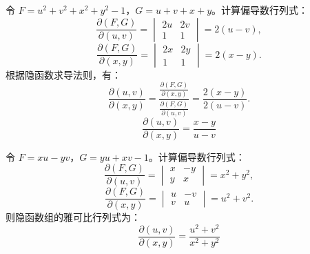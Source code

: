 \begin{solution}

    令 $F = u^2 + v^2 + x^2 + y^2 - 1$，$G = u + v + x + y$。计算偏导数行列式：
    \begin{equation}
        \frac{\partial(F,G)}{\partial(u,v)} =
        \begin{vmatrix}
            2u & 2v \\
            1  & 1
        \end{vmatrix} = 2(u - v),
    \end{equation}
    \begin{equation}
        \frac{\partial(F,G)}{\partial(x,y)} =
        \begin{vmatrix}
            2x & 2y \\
            1  & 1
        \end{vmatrix} = 2(x - y).
    \end{equation}
    根据隐函数求导法则，有：
    \begin{equation}
        \frac{\partial(u,v)}{\partial(x,y)} = \frac{\frac{\partial(F,G)}{\partial(x,y)}}{\frac{\partial(F,G)}{\partial(u,v)}} = \frac{2(x - y)}{2(u - v)}.
    \end{equation}
    \begin{equation}
        \boxed{\frac{\partial(u,v)}{\partial(x,y)} = \frac{x - y}{u - v}}
    \end{equation}


    令 $F = xu - yv$，$G = yu + xv - 1$。计算偏导数行列式：
    \begin{equation}
        \frac{\partial(F,G)}{\partial(u,v)} =
        \begin{vmatrix}
            x & -y \\
            y & x
        \end{vmatrix} = x^2 + y^2,
    \end{equation}
    \begin{equation}
        \frac{\partial(F,G)}{\partial(x,y)} =
        \begin{vmatrix}
            u & -v \\
            v & u
        \end{vmatrix} = u^2 + v^2.
    \end{equation}
    则隐函数组的雅可比行列式为：
    \begin{equation}
        \boxed{\frac{\partial(u,v)}{\partial(x,y)} = \frac{u^2 + v^2}{x^2 + y^2}}
    \end{equation}


\end{solution}
